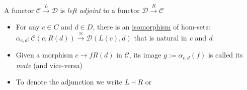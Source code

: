 A functor $\mathcal{C}\xrightarrow{L}\mathcal{D}$ is \emph{left adjoint} to a functor  $\mathcal{D}\xrightarrow{R}\mathcal{C}$

\begin{itemize}
    \item  For any $c \in C$ and $d \in D$, there is an \href{doc/1 math/Seven Sketches in Compositionality/Chapter 3: Databases/2 Categories/5 Isomorphisms in a category/1 Isomorphism}{isomorphism} of hom-sets: $\alpha_{c,d}: \mathcal{C}(c,R(d)) \xrightarrow{\cong} \mathcal{D}(L(c),d)$ that is natural in \emph{c} and \emph{d}.
    \item Given a morphism $c \rightarrow{f} R(d)$ in $\mathcal{C}$, its image $g:=\alpha_{c,d}(f)$ is called its \emph{mate} (and vice-versa)
    \item To denote the adjunction we write $L \dashv R$ or 

  \end{itemize}
